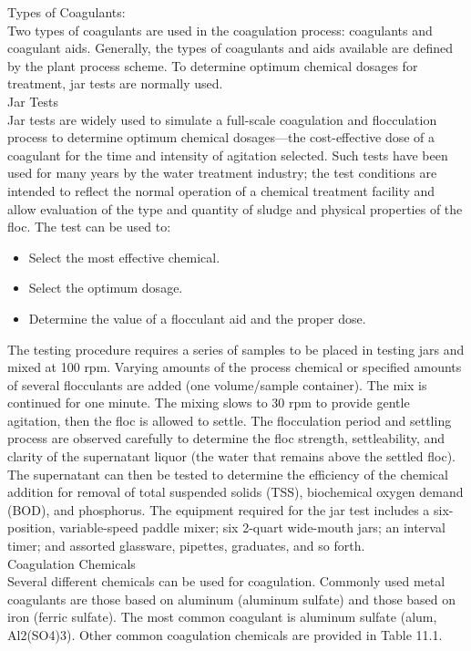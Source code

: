 Types of Coagulants:\\
Two types of coagulants are used in the coagulation process: coagulants and coagulant aids. Generally, the types of coagulants and aids available are defined by the plant process scheme. To determine optimum chemical dosages for treatment, jar tests are normally used.\\
Jar Tests\\
Jar tests are widely used to simulate a full-scale coagulation and flocculation process to determine optimum chemical dosages—the cost-effective dose of a coagulant for the time and intensity of agitation selected. Such tests have been used for many years by the water treatment industry; the test conditions are intended to reflect the normal operation of a chemical treatment facility and allow evaluation of the type and quantity of sludge and physical properties of the floc. The test can be used to:\\
\begin{itemize}
\item Select the most effective chemical.
\item Select the optimum dosage.
\item Determine the value of a flocculant aid and the proper dose.
\end{itemize}
The testing procedure requires a series of samples to be placed in testing jars and mixed at 100 rpm. Varying amounts of the process chemical or specified amounts of several flocculants are added (one volume/sample container). The mix is continued
for one minute. The mixing slows to 30 rpm to provide gentle agitation, then the floc is allowed to settle. The flocculation period and settling process are observed carefully to determine the floc strength, settleability, and clarity of the supernatant liquor (the water that remains above the settled floc). The supernatant can then be tested to determine the efficiency of the chemical addition for removal of total suspended solids (TSS), biochemical oxygen demand (BOD), and phosphorus. The equipment required for the jar test includes a six-position, variable-speed paddle mixer; six 2-quart wide-mouth jars; an interval timer; and assorted glassware, pipettes, graduates, and so forth.\\

Coagulation Chemicals\\
Several different chemicals can be used for coagulation. Commonly used metal coagulants are those based on aluminum (aluminum sulfate) and those based on iron (ferric sulfate). The most common coagulant is aluminum sulfate (alum, Al2(SO4)3). Other common coagulation chemicals are provided in Table 11.1.\\


